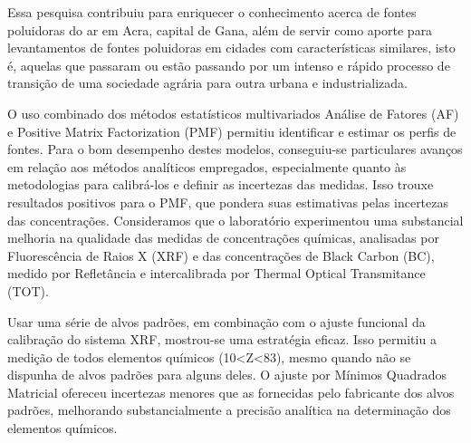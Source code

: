 
Essa pesquisa contribuiu para enriquecer o conhecimento acerca de fontes poluidoras do ar em Acra, capital de Gana, além de servir como aporte para levantamentos de fontes poluidoras em cidades com características similares, isto é, aquelas que passaram ou estão passando por um intenso e rápido processo de transição de uma sociedade agrária para outra urbana e industrializada.%
%
%  

O uso combinado dos métodos estatísticos multivariados Análise de Fatores (AF) e Positive Matrix Factorization (PMF) permitiu identificar e estimar os perfis de fontes. Para o bom desempenho destes modelos, conseguiu-se particulares avanços em relação aos métodos analíticos empregados, especialmente quanto às metodologias para calibrá-los e definir as incertezas das medidas. Isso trouxe resultados positivos para o PMF, que pondera suas estimativas pelas incertezas das concentrações. Consideramos que o laboratório experimentou uma substancial melhoria na qualidade das medidas de concentrações químicas, analisadas por Fluorescência de Raios X (XRF) e das concentrações de Black Carbon (BC), medido por Refletância e intercalibrada por Thermal Optical Transmitance (TOT). 

Usar uma série de alvos padrões, em combinação com o ajuste funcional da calibração do sistema XRF, mostrou-se uma estratégia eficaz. Isso permitiu a medição de todos elementos químicos (10<Z<83), mesmo quando não se dispunha de alvos padrões para alguns deles. O ajuste por Mínimos Quadrados Matricial ofereceu incertezas menores que as fornecidas pelo fabricante dos alvos padrões, melhorando substancialmente a precisão analítica na determinação dos elementos químicos.

